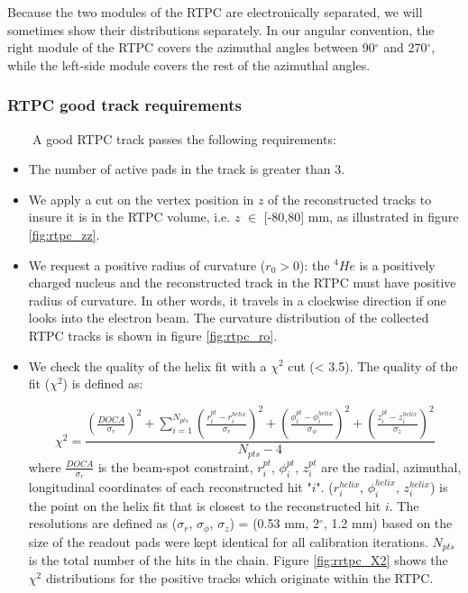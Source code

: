 Because the two modules of the RTPC are electronically separated, we will sometimes show their distributions separately. In our angular convention, the right module of the RTPC covers the azimuthal angles between 90$^{\circ}$ and 270$^{\circ}$, while the left-side module covers the rest of the azimuthal angles. 

\subsubsection{RTPC good track requirements}

~~~~A good RTPC track passes the following requirements:
\begin{itemize}
\item The number of active pads in the track is greater than 3. 

\item We apply a cut on the vertex position in $z$ of the reconstructed tracks to insure it is in the RTPC volume, i.e. $z$ $\in$ [-80,80] mm, as illustrated in figure \ref{fig:rtpc_zz}.  

\item We request a positive radius of curvature ($r_{0}>0$): the $^4He$ is a positively 
   charged nucleus and the reconstructed track in the RTPC must have positive 
   radius of curvature. In other words, it travels in a clockwise direction if 
   one looks into the electron beam. The curvature distribution of the 
   collected RTPC tracks is shown in figure \ref{fig:rtpc_ro}.

\item We check the quality of the helix fit with a $\chi^{2}$ cut (< 3.5). The quality of the fit ($\chi^{2}$) is defined as:

\begin{equation}
   \chi^{2} = \frac{\displaystyle \left(\frac{DOCA}{\sigma_r}\right)^2 
       + \sum_{i = 1}^{ N_{pts}} \left(\frac{r^{pt}_{i} 
      - r^{helix}_{i} }{\sigma_{r}}\right)^{2}  + \left( \frac{\phi^{pt}_{i} - 
      \phi^{helix}_{i} }{\sigma_{\phi}}\right)^{2} + \left( \frac{z^{pt}_{i} - 
   z^{helix}_{i} }{\sigma_{z} } \right)^{2}}{N_{pts} - 4}
\end{equation}
where $\frac{DOCA}{\sigma_r}$ is the beam-spot constraint, $r^{pt}_{i}$, 
$\phi^{pt}_{i}$, $z^{pt}_{i}$ are the radial, azimuthal, longitudinal 
coordinates of each reconstructed hit "$i$". ($r^{helix}_{i}$,
$\phi^{helix}_{i}$, $z^{helix}_{i}$) is the point on the helix fit that is 
closest to the reconstructed hit $i$. The resolutions are defined as ($\sigma_{r}$, 
$\sigma_{\phi}$, $\sigma_{z}$) = (0.53 mm, 2$^{\circ}$, 1.2 mm) based on the size
of the readout pads were kept identical for all calibration iterations. 
$N_{pts}$ is the total number of the hits in the chain.  Figure 
\ref{fig:rrtpc_X2} shows the $\chi^{2}$ distributions for the positive tracks 
which originate within the RTPC.


\end{itemize}
